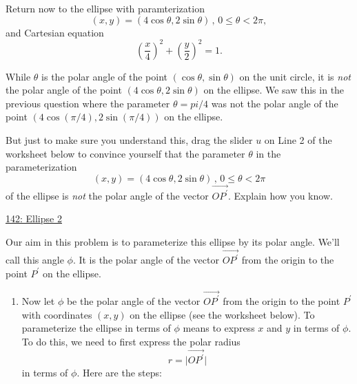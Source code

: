 \documentclass{ximera}
\begin{document}
\begin{example} \label{EX:9dfrebbvcxbfg}
Return now to the ellipse with paramterization
\[
      (x,y) = (4\cos \theta , 2\sin\theta) \, , \, 0\leq \theta <2\pi ,
\]
and Cartesian equation
\[
     \left( \frac{x}{4} \right)^2 + \left( \frac{y}{2} \right)^2 = 1.
\]

While $\theta$ is the polar angle of the point $(\cos\theta, \sin\theta)$ on the unit circle, it is \emph{not} the polar angle of the point $(4\cos \theta , 2\sin\theta)$ on the ellipse. We saw this in the previous question where the parameter $\theta=pi/4$ was not the polar angle of the point $(4\cos (\pi/4) , 2\sin (\pi/4))$ on the ellipse.

But just to make sure you understand this, drag the slider $u$ on Line 2 of the worksheet below to convince yourself that the parameter $\theta$ in the parameterization 
\[
    (x,y) = (4\cos \theta , 2\sin\theta ) \, , \, 0 \leq \theta <2\pi 
\]
of the ellipse is \emph{not} the polar angle of the vector $\overrightarrow{OP^\prime}$. Explain how you know.

\begin{freeResponse}
\end{freeResponse}


\begin{onlineOnly}
    \begin{center}
\end{center}
\end{onlineOnly}

\href{https://www.desmos.com/calculator/nbdmgb1nbv}{142: Ellipse 2}

Our aim in this problem is to parameterize this ellipse by its polar angle. We'll call this angle $\phi$. It is the polar angle of the vector $\overrightarrow{OP^\prime}$ from the origin to the point $P^\prime$ on the ellipse.


\begin{enumerate}

\item Now let $\phi$ be the polar angle of the vector $\overrightarrow{OP^\prime}$ from the origin to the point $P^\prime$ with coordinates $(x,y)$ on the ellipse (see the worksheet below). To parameterize the ellipse in terms of $\phi$ means to express $x$ and $y$ in terms of $\phi$. To do this, we need to first express the polar radius  
\[
   r = \Big| \overrightarrow{OP^\prime}  \Big|
\]
in terms of $\phi$. Here are the steps:

\begin{onlineOnly}
    \begin{center}
\end{center}
\end{onlineOnly}


\end{enumerate}
\end{example}
\end{document}
